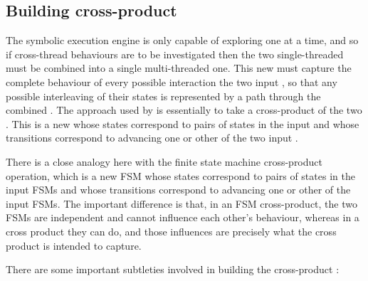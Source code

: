 
\subsection{Building cross-product {\StateMachines}}
\label{sect:using:build_cross_product}

The symbolic execution engine is only capable of exploring one
{\StateMachine} at a time, and so if cross-thread behaviours are to be
investigated then the two single-threaded {\StateMachines} must be
combined into a single multi-threaded one.  This new {\StateMachine}
must capture the complete behaviour of every possible interaction the
two input {\StateMachines}, so that any possible interleaving of their
states is represented by a path through the combined {\StateMachine}.
The approach used by {\technique} is essentially to take a
cross-product of the two {\StateMachines}.  This is a new
{\StateMachine} whose states correspond to pairs of states in the
input {\StateMachine} and whose transitions correspond to advancing
one or other of the two input {\StateMachines}.

There is a close analogy here with the finite state machine
cross-product operation, which is a new FSM whose states correspond to
pairs of states in the input FSMs and whose transitions correspond to
advancing one or other of the input FSMs.  The important difference is
that, in an FSM cross-product, the two FSMs are independent and cannot
influence each other's behaviour, whereas in a {\StateMachine} cross
product they can do, and those influences are precisely what the cross
product is intended to capture.

There are some important subtleties involved in building the
cross-product {\StateMachine}:

